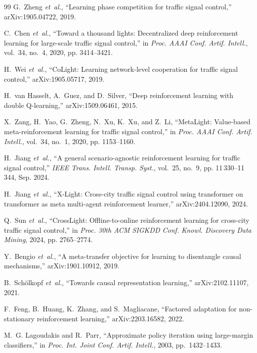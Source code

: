 \documentclass[letterpaper,journal]{IEEEtran}
\begin{document}
\begin{thebibliography}{99}
G.~Zheng \emph{et~al.}, ``Learning phase competition for traffic signal control,'' arXiv:1905.04722, 2019.

C.~Chen \emph{et~al.}, ``Toward a thousand lights: Decentralized deep reinforcement learning for large-scale traffic signal control,'' in \emph{Proc. AAAI Conf. Artif. Intell.}, vol.~34, no.~4, 2020, pp. 3414--3421.

H.~Wei \emph{et~al.}, ``{CoLight}: Learning network-level cooperation for traffic signal control,'' arXiv:1905.05717, 2019.

H.~van Hasselt, A.~Guez, and D.~Silver, ``Deep reinforcement learning with double Q-learning,'' arXiv:1509.06461, 2015.

X.~Zang, H.~Yao, G.~Zheng, N.~Xu, K.~Xu, and Z.~Li, ``{MetaLight}: Value-based meta-reinforcement learning for traffic signal control,'' in \emph{Proc. AAAI Conf. Artif. Intell.}, vol.~34, no.~1, 2020, pp. 1153--1160.

H.~Jiang \emph{et~al.}, ``A general scenario-agnostic reinforcement learning for traffic signal control,'' \emph{IEEE Trans. Intell. Transp. Syst.}, vol.~25, no.~9, pp. 11\,330--11\,344, Sep. 2024.

H.~Jiang \emph{et~al.}, ``{X-Light}: Cross-city traffic signal control using transformer on transformer as meta multi-agent reinforcement learner,'' arXiv:2404.12090, 2024.

Q.~Sun \emph{et~al.}, ``{CrossLight}: Offline-to-online reinforcement learning for cross-city traffic signal control,'' in \emph{Proc. 30th ACM SIGKDD Conf. Knowl. Discovery Data Mining}, 2024, pp. 2765--2774.

Y.~Bengio \emph{et~al.}, ``A meta-transfer objective for learning to disentangle causal mechanisms,'' arXiv:1901.10912, 2019.

B.~Sch{\"o}lkopf \emph{et~al.}, ``Towards causal representation learning,'' arXiv:2102.11107, 2021.

F.~Feng, B.~Huang, K.~Zhang, and S.~Magliacane, ``Factored adaptation for non-stationary reinforcement learning,'' arXiv:2203.16582, 2022.

M.~G. Lagoudakis and R.~Parr, ``Approximate policy iteration using large-margin classifiers,'' in \emph{Proc. Int. Joint Conf. Artif. Intell.}, 2003, pp.~1432--1433.


\end{thebibliography}
\end{document}
